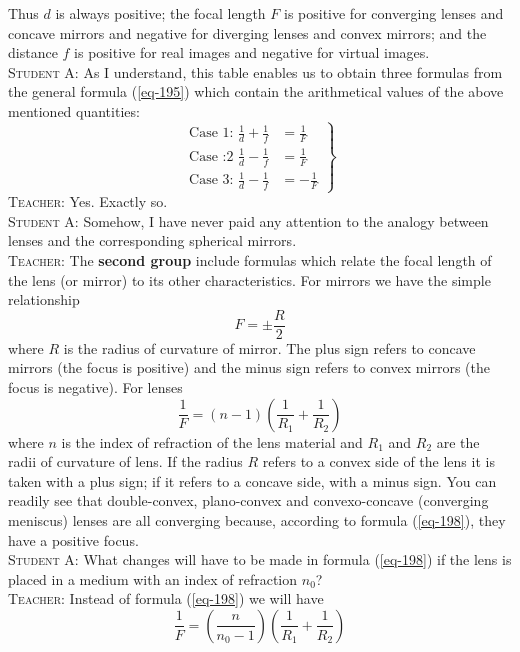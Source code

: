 \documentclass[a4paper,sfsidenotes]{tufte-book}
\begin{document}
Thus $d$ is always positive; the focal length $F$ is positive for converging lenses and concave mirrors and negative for diverging lenses and convex mirrors; and the distance $f$ is positive for real images and negative for virtual images.
\\
\textsc{Student A:} As I understand, this table enables us to obtain
three formulas from the general formula (\ref{eq-195}) which
contain the arithmetical values of the above mentioned quantities:
\\
\begin{equation}
\left.
\begin{split}
\text{Case 1:}\,\, \frac{1}{d} + \frac{1}{f} &  = \frac{1}{F} \\
\text{Case :2}\,\, \frac{1}{d}-\frac{1}{f} & = \frac{1}{F} \\
\text{Case 3:}\,\, \frac{1}{d}-\frac{1}{f} & = -\frac{1}{F}
\label{eq-196}
\end{split}
\right\}
\end{equation}
\textsc{Teacher:} Yes. Exactly so.
\\
\textsc{Student A:} Somehow, I have never paid any attention to the analogy between lenses and the corresponding spherical mirrors.
\\ 
\textsc{Teacher:} The \textbf{second group} include formulas which relate the focal length of the lens (or mirror) to its other characteristics. For mirrors we have the simple relationship
 \begin{equation}%
F = \pm \frac{R}{2} 
\label{eq-197}
\end{equation}
where $R$ is the radius of curvature of mirror. The plus sign refers to concave mirrors (the focus is positive) and the minus sign refers to convex mirrors (the focus is negative). For lenses
\begin{equation}%
\frac{1}{F} = (n-1) \left( \frac{1}{R_{1}} + \frac{1}{R_{2}} \right) 
\label{eq-198}
\end{equation}
 where $n$ is the index of refraction of the lens material and $R_{1}$ and $R_{2}$ are the radii of curvature of lens. If the radius $R$ refers to a convex side of the lens it is taken with a plus sign; if it refers to a concave side, with a minus sign. You can readily see that double-convex, plano-convex and convexo-concave (converging meniscus) lenses are all converging because, according to formula (\ref{eq-198}), they have a positive focus.
 \\
\textsc{Student A:} What changes will have to be made in formula (\ref{eq-198}) if the lens is placed in a medium with an index of refraction $n_{0}$?
\\ 
\textsc{Teacher:} Instead of formula (\ref{eq-198}) we will have
\begin{equation}%
\frac{1}{F} = \left( \frac{n}{n_{0} - 1}\right) \left( \frac{1}{R_{1}} + \frac{1}{R_{2}} \right)
\label{eq-199}
\end{equation}
\end{document}
